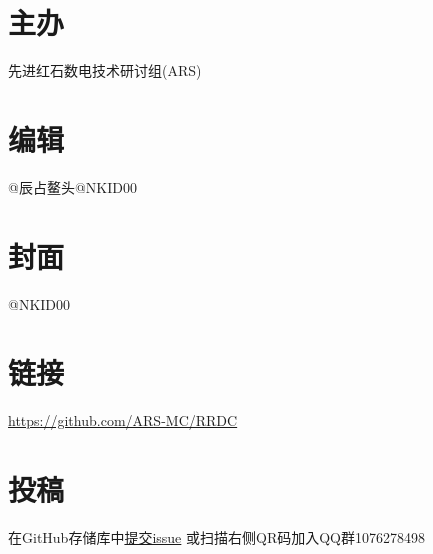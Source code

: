 \documentclass[UTF8,12pt,punct=kaiming,fontset=none]{ctexart}
\begin{document}
\begin{spacing}{1.5}
\begin{minipage}[c]{0.55\linewidth}
    \section*{主办}
    先进红石数电技术研讨组(ARS)

    \section*{编辑}
    @辰占鳌头\hspace{0.5cm}@NKID00

    \section*{封面}
    @NKID00

    \section*{链接}
    \url{https://github.com/ARS-MC/RRDC}

    \section*{投稿}
    在GitHub存储库中\href{https://github.com/ARS-MC/RRDC/issues/new?assignees=&labels=%E6%8A%95%E7%A8%BF&template=contribute.md&title=%E5%9C%A8%E6%AD%A4%E5%A4%84%E5%A1%AB%E5%86%99%E6%A0%87%E9%A2%98}{提交issue} 或扫描右侧QR码加入QQ群1076278498
\end{minipage}
\end{spacing}
\end{document}
